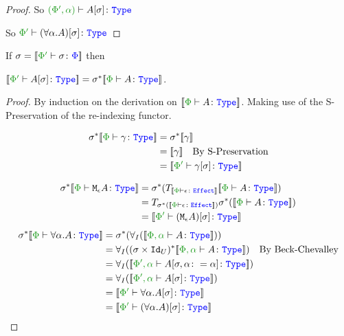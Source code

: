 \documentclass{report}
\begin{document}
\begin{framed}
\begin{proof}
        So $\wellformedt{(\P',\a)}{A\ssi}$
        
        So $\wellformedt{\P'}{(\all{\a}{A})\ssi}$
        
    \end{proof}
    
\end{framed}\begin{theorem}
    If $\si = \deno{\typerelation{\P'}{\si}{\P}}$ then 
    
    $\deno{\typerelation{\P'}{A\ssi}{\type}} = \si\star\deno{\typerelation{\P}{A}{\type}}$.
\end{theorem}

\begin{framed}
    \begin{proof}
        By induction on the derivation on $\deno{\typerelation{\P}{A}{\type}}$. Making use of the S-Preservation of the re-indexing functor.
        
        \case{\tground}
        \begin{align*}
            \si\star\deno{\typerelation{\P}{\g}{\type}} &= \si\star\deno{\g}\\
            & =  \deno{\g}\qt{By S-Preservation}\\
            & = \deno{\typerelation{\P'}{\g\ssi}{\type}}
        \end{align*}
        
        \case{\teffect}
        \begin{align*}
            \si\star\deno{\typerelation{\P}{\mea}{\type}} & =  \si\star(\T{\deno{\typerelation{\P}{\e}{\effect}}}{\deno{\typerelation{\P}{A}{\type}}})\\
            &= \T{\si\star(\deno{\typerelation{\P}{\e}{\effect}})}{\si\star(\deno{\typerelation{\P}{A}{\type}})}\\
            & = \deno{\typerelation{\P'}{(\mea)\ssi}{\type}}
        \end{align*}
        \case{\tquant}
            \begin{align*}
                \si\star\deno{\typerelation{\P}{\all{\a}A}{\type}} & = \si\star(\allI(\deno{\typerelation{\P,\a}{A}{\type}}))\\
                & = \allI((\si\times\Id{U})\star\deno{\typerelation{\P,\a}{A}{\type}})\qt{By Beck-Chevalley}\\
                & = \allI(\deno{\typerelation{\P',\a}{A\sub{\si, \a\setto\a}}{\type}})\\
                & = \allI(\deno{\typerelation{\P',\a}{A\ssi}{\type}})\\
                & = \deno{\typerelation{\P'}{\all{\a}{A\ssi}}{\type}}\\
                & = \deno{\typerelation{\P'}{(\all{\a}{A})\ssi}{\type}}\\
            \end{align*}
        

\end{proof}
\end{framed}
\end{document}
